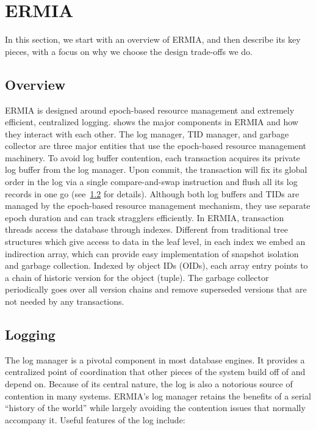 
\section{ERMIA}
In this section, we start with an overview of ERMIA, and then describe its key pieces, with a focus on why we choose the design trade-offs we do.

\subsection{Overview}
ERMIA is designed around epoch-based resource management and extremely efficient, centralized logging.  shows the major components in ERMIA and how they interact with each other. The log manager, TID manager, and garbage collector are three major entities that use the epoch-based resource management machinery. To avoid log buffer contention, each transaction acquires its private log buffer from the log manager. Upon commit, the transaction will fix its global order in the log via a single compare-and-swap instruction and flush all its log records in one go (see~\ref{subsec:logging} for details). Although both log buffers and TIDs are managed by the epoch-based resource management mechanism, they use separate epoch duration and can track stragglers efficiently. In ERMIA, transaction threads access the database through indexes. Different from traditional tree structures which give access to data in the leaf level, in each index we embed an indirection array, which can provide easy implementation of snapshot isolation and garbage collection. Indexed by object IDs (OIDs), each array entry points to a chain of historic version for the object (tuple). The garbage collector periodically goes over all version chains and remove superseded versions that are not needed by any transactions.

\subsection{Logging}
\label{subsec:logging}
The log manager is a pivotal component in most database engines. It provides a centralized point of coordination that other pieces of the system build off of and depend on. Because of its central nature, the log is also a notorious source of contention in many systems. ERMIA's log manager retains the benefits of a serial ``history of the world'' while largely avoiding the contention issues that normally accompany it. Useful features of the log include:

